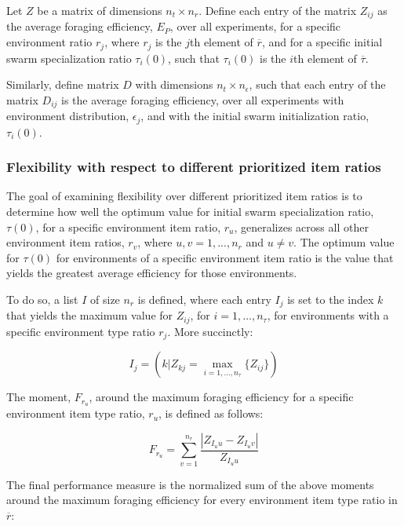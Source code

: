 Let $Z$ be a matrix of dimensions $n_t \times n_r$. Define each entry of the matrix $Z_{ij}$ as the average foraging efficiency, $E_P$, over all experiments, for a specific environment ratio $r_j$, where $r_j$ is the $j$th element of $\overline{r}$, and for a specific initial swarm specialization ratio $\tau_i(0)$, such that $\tau_i(0)$ is the $i$th element of $\overline{\tau}$.

Similarly, define matrix $D$ with dimensions $n_t \times n_\epsilon$, such that each entry of the matrix $D_{ij}$ is the average foraging efficiency, over all experiments with environment distribution, $\epsilon_j$, and with the initial swarm initialization ratio, $\tau_i(0)$.


\subsubsection{Flexibility with respect to different prioritized item ratios}
\label{setup:flexibility:prioritizeditemratio}

The goal of examining flexibility over different prioritized item ratios is to determine how well the optimum value for initial swarm specialization ratio, $\tau(0)$, for a specific environment item ratio, $r_u$, generalizes across all other environment item ratios, $r_v$, where $u,v = 1,...,n_r$ and $u \neq v$. The optimum value for $\tau(0)$ for environments of a specific environment item ratio is the value that yields the greatest average efficiency for those environments.

To do so, a list $I$ of size $n_r$ is defined, where each entry $I_j$ is set to the index $k$ that yields the maximum value for $Z_{ij}$, for $i = 1,..., n_\tau$, for environments with a specific environment type ratio $r_j$. More succinctly:

\begin{equation}
I_j = ( k | Z_{kj} = \max_{i=1,...,n_\tau}\{Z_{ij}\} )
\end{equation}

The moment, $F_{r_u}$, around the maximum foraging efficiency for a specific environment item type ratio, $r_u$, is defined as follows: 

\begin{equation}
F_{r_u} = \sum_{v=1}^{n_r}\dfrac{|Z_{I_uu}- Z_{I_uv}|}{Z_{I_uu}}
\end{equation}

The final performance measure is the normalized sum of the above moments around the maximum foraging efficiency for every environment item type ratio in $\overline{r}$:

